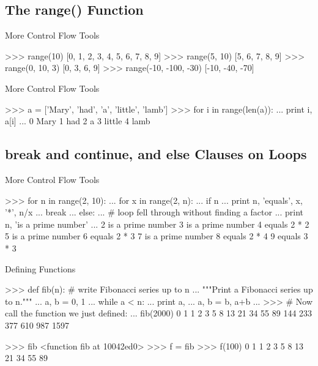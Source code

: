 \documentclass[11pt]{beamer}
\begin{document}
\subsection{The range() Function}
\begin{frame}[containsverbatim]{More Control Flow Tools}
\begin{python}
>>> range(10)
[0, 1, 2, 3, 4, 5, 6, 7, 8, 9]
>>> range(5, 10)
[5, 6, 7, 8, 9]
>>> range(0, 10, 3)
[0, 3, 6, 9]
>>> range(-10, -100, -30)
[-10, -40, -70]
\end{python}
\end{frame}


\begin{frame}[containsverbatim]{More Control Flow Tools}
\begin{python}
>>> a = ['Mary', 'had', 'a', 'little', 'lamb']
>>> for i in range(len(a)):
...    print i, a[i]
...
0 Mary
1 had
2 a
3 little
4 lamb
\end{python}
\end{frame}

\subsection{break and continue, and else Clauses on Loops}
\begin{frame}[containsverbatim]{More Control Flow Tools}
\begin{python}
>>> for n in range(2, 10):
...    for x in range(2, n):
...        if n %
...            print n, 'equals', x, '*', n/x
...            break
...    else:
...        # loop fell through without finding a factor
...        print n, 'is a prime number'
...
2 is a prime number
3 is a prime number
4 equals 2 * 2
5 is a prime number
6 equals 2 * 3
7 is a prime number
8 equals 2 * 4
9 equals 3 * 3
\end{python}
\end{frame}


\begin{frame}[containsverbatim]{Defining Functions}
\begin{python}
>>> def fib(n):    # write Fibonacci series up to n
...    """Print a Fibonacci series up to n."""
...    a, b = 0, 1
...    while a < n:
...        print a,
...        a, b = b, a+b
...
>>> # Now call the function we just defined:
... fib(2000)
0 1 1 2 3 5 8 13 21 34 55 89 144 233 377 610 987 1597

>>> fib
<function fib at 10042ed0>
>>> f = fib
>>> f(100)
0 1 1 2 3 5 8 13 21 34 55 89
\end{python}
\end{frame}
\end{document}
